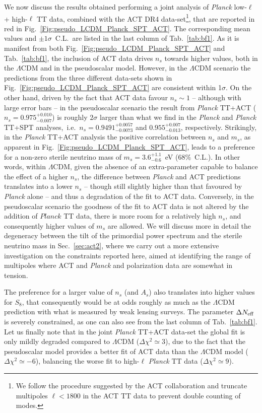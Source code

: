 \documentclass[a4paper,11pt]{article}
\begin{document}
We now discuss the results obtained performing a joint analysis of \textit{Planck} low-$\ell$ + high-$\ell$ TT data, combined with the ACT DR4 data-set\footnote{We follow the procedure suggested by the ACT collaboration and truncate multipoles $\ell < 1800$ in the ACT TT data to prevent double counting of modes.}, that are reported in red in Fig.~\ref{Fig:pseudo_LCDM_Planck_SPT_ACT}. The corresponding mean values and $\pm 1 \sigma$~C.L.\ are listed in the last column of Tab.~\ref{tab:bf1}. As it is manifest from both Fig.~\ref{Fig:pseudo_LCDM_Planck_SPT_ACT} and Tab.~\ref{tab:bf1}, the inclusion of ACT data drives $n_s$ towards higher values, both in the $\Lambda$CDM and in the pseudoscalar model. 
However, in the $\Lambda$CDM scenario the predictions from the three different data-sets shown in Fig.~\ref{Fig:pseudo_LCDM_Planck_SPT_ACT} are consistent within 1$\sigma$. On the other hand, driven by the fact that ACT data favour $n_s \sim 1$ -- although with large error bars -- in the pseudoscalar scenario the result from \textit{Planck} TT+ACT ($n_s = 0.975_{-0.007}^{+0.010}$) is roughly $2 \sigma$ larger than what we find in the \textit{Planck} and \textit{Planck} TT+SPT analyses,~i.e.\ $n_s = 0.9491_{-0.0073}^{+0.0057}$ and $0.955_{-0.013}^{+0.007}$, respectively.
Strikingly, in the \textit{Planck} TT+ACT analysis the positive correlation between $n_s$ and $m_s$, as apparent in Fig.~\ref{Fig:pseudo_LCDM_Planck_SPT_ACT}, leads to a preference for a non-zero sterile neutrino mass of $m_s=3.6^{+1.1}_{-0.6}$~eV (68\%~C.L.).
In other words, within $\Lambda$CDM, given the absence of an extra-parameter capable to balance the effect of a higher $n_s$, the difference between \textit{Planck} and ACT predictions translates into a lower $n_s$ -- though still slightly higher than that favoured by \textit{Planck} alone -- and thus a degradation of the fit to ACT data. Conversely, in the pseudoscalar scenario the goodness of the fit to ACT data is not altered by the addition of $Planck$ TT data, there is more room for a relatively high $n_s$, and consequently higher values of $m_s$ are allowed.
We will discuss more in detail the degeneracy between the {tilt of the primordial power spectrum} and the sterile neutrino mass in Sec.~\ref{sec:act2}, where we carry out a more extensive investigation on the constraints reported here, aimed at identifying the range of multipoles where ACT and \emph{Planck} and polarization data are somewhat in tension.

The preference for a larger value of $n_s$ (and $A_s$) also translates into higher values for $S_8$, that {consequently} would be at odds roughly as much as the $\Lambda$CDM prediction {with what is measured by weak lensing surveys}.
The parameter $\Delta N_{\rm eff}$ is severely constrained, as one can also see from the last column of Tab.~\ref{tab:bf1}.
Let us finally note that in the joint \textit{Planck} TT+ACT data-set the global fit is only mildly degraded compared to $\Lambda$CDM ($\Delta \chi^2 \simeq 3$), due to the fact that the pseudoscalar model provides a better fit {of} ACT data {than the $\Lambda$CDM model} ($\Delta \chi^2 \simeq -6$), balancing the worse fit to high-$\ell$ \emph{Planck} TT data ($\Delta \chi^2 \simeq 9$).
\end{document}
